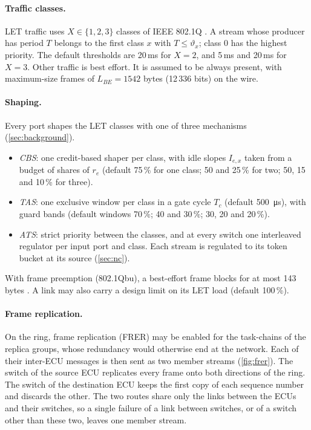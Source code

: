 \paragraph{Traffic classes.} LET traffic uses $X\in\{1,2,3\}$ classes of
IEEE 802.1Q \cite{ieee8021q2022}. A stream whose producer has period $T$
belongs to the first class $x$ with $T\le\vartheta_x$; class 0 has the
highest priority. The default thresholds are 20\,ms for $X=2$, and
5\,ms and 20\,ms for $X=3$. Other traffic is best effort. It is assumed to
be always present, with maximum-size frames of $L_{BE}=1542$ bytes (12\,336 bits) on the
wire.

\paragraph{Shaping.} Every port shapes the LET classes with one of three
mechanisms (\cref{sec:background}).
\begin{itemize}
\item \emph{CBS}: one credit-based shaper per class, with idle slopes
$I_{e,x}$ taken from a budget of shares of $r_e$ (default 75\,\% for one
class; 50 and 25\,\% for two; 50, 15 and 10\,\% for three).
\item \emph{TAS}: one exclusive window per class in a gate cycle $T_c$
(default \SI{500}{\micro s}), with guard bands (default windows 70\,\%;
40 and 30\,\%; 30, 20 and 20\,\%).
\item \emph{ATS}: strict priority between the classes, and at every switch
one interleaved regulator per input port and class. Each stream is
regulated to its token bucket at its source (\cref{sec:nc}).
\end{itemize}
With frame preemption (802.1Qbu), a best-effort frame blocks for at most
143 bytes \cite{thiele2016formal}. A link may also carry a design limit on
its LET load (default 100\,\%).

\paragraph{Frame replication.} On the ring, frame replication (FRER) may
be enabled for the task-chains of the replica groups, whose redundancy
would otherwise end at the network. Each of their inter-ECU messages is
then sent as two member streams (\cref{fig:frer}). The switch of the source
ECU replicates every frame onto both directions of the ring. The switch of
the destination ECU keeps the first copy of each sequence number and
discards the other. The two routes share only the links between the ECUs
and their switches, so a single failure of a link between switches, or of
a switch other than these two, leaves one member stream.

